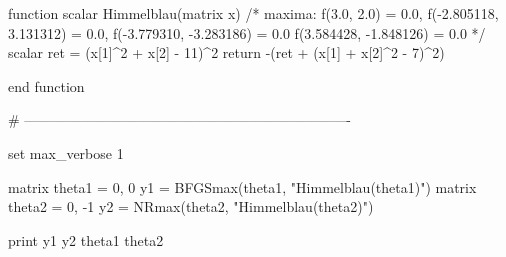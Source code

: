 \begin{code}
function scalar Himmelblau(matrix x)
    /* maxima:
    f(3.0, 2.0) = 0.0, 
    f(-2.805118, 3.131312) = 0.0,
    f(-3.779310, -3.283186) = 0.0
    f(3.584428, -1.848126) = 0.0
    */
    scalar ret = (x[1]^2 + x[2] - 11)^2
    return -(ret + (x[1] + x[2]^2 - 7)^2)

end function

# ----------------------------------------------------------------------

set max_verbose 1

matrix theta1 = { 0, 0 }
y1 = BFGSmax(theta1, "Himmelblau(theta1)")
matrix theta2 = { 0, -1 }
y2 = NRmax(theta2, "Himmelblau(theta2)")

print y1 y2 theta1 theta2
\end{code}

